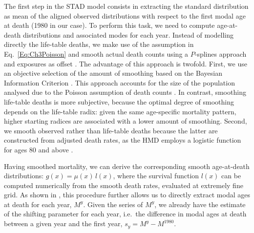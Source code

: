 \documentclass[Thesis]{subfiles}
\begin{document}
The first step in the STAD model consists in extracting the standard distribution as mean of the aligned observed distributions with respect to the first modal age at death (1980 in our case). To perform this task, we need to compute age-at-death distributions and associated modes for each year. Instead of modelling directly the life-table deaths, we make use of the assumption in Eq.~\eqref{Eq:Ch3Poisson} and smooth actual death counts using a $P$-splines approach and exposures as offset \citep{eilers1996flexible,camarda2012mortalitysmooth}. The advantage of this approach is twofold. First, we use an objective selection of the amount of smoothing based on the Bayesian Information Criterion \citep[BIC,][see Appendix \ref{Subsec:Ch3appA}]{schwarz1978estimating}. This approach accounts for the size of the population analysed due to the Poisson assumption of death counts \citep{brillinger1986biometrics}. In contrast, smoothing life-table deaths is more subjective, because the optimal degree of smoothing depends on the life-table radix: given the same age-specific mortality pattern, higher starting radices are associated with a lower amount of smoothing. Second, we smooth observed rather than life-table deaths because the latter are constructed from adjusted death rates, as the HMD employs a logistic function for ages 80 and above \citep{Wilmoth2007}. 

Having smoothed mortality, we can derive the corresponding smooth
age-at-death distributions: $g(x)=\mu(x)\,l(x)$, where the survival
function $l(x)$ can be computed numerically from the smooth death
rates, evaluated at extremely fine grid. As shown in
\citet{ouellette2011changes}, this procedure further allows us to directly extract modal ages at death for each year, $M^{y}$. 
Given the series of $M^{y}$, we already have the
estimate of the shifting parameter for each year, i.e.~the difference in modal
ages at death between a given year and the first year,  $s_{y} = M^{y}-M^{1980}$.
\end{document}

